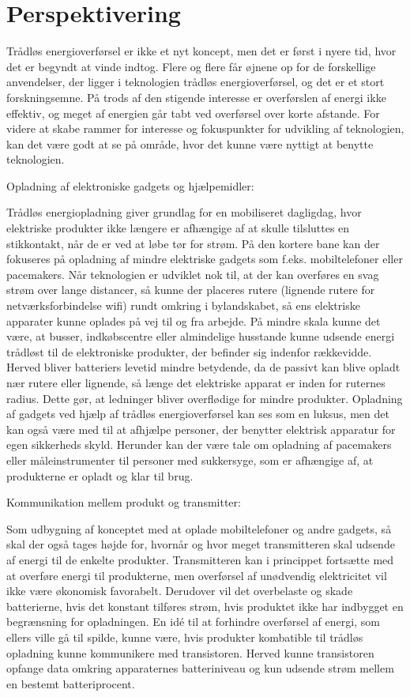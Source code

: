 \chapter{Perspektivering}

Trådløs energioverførsel er ikke et nyt koncept, men det er først i nyere tid, hvor det er begyndt at vinde indtog. Flere og flere får øjnene op for de forskellige anvendelser, der ligger i teknologien trådløs energioverførsel, og det er et stort forskningsemne. På trods af den stigende interesse er overførslen af energi ikke effektiv, og meget af energien går tabt ved overførsel over korte afstande. For videre at skabe rammer for interesse og fokuspunkter for udvikling af teknologien, kan det være godt at se på område, hvor det kunne være nyttigt at benytte teknologien.

Opladning af elektroniske gadgets og hjælpemidler:
 	
Trådløs energiopladning giver grundlag for en mobiliseret dagligdag, hvor elektriske produkter ikke længere er afhængige af at skulle tilsluttes en stikkontakt, når de er ved at løbe tør for strøm. På den kortere bane kan der fokuseres på opladning af mindre elektriske gadgets som f.eks. mobiltelefoner eller pacemakers. Når teknologien er udviklet nok til, at der kan overføres en svag strøm over lange distancer, så kunne der placeres rutere (lignende rutere for netværksforbindelse wifi) rundt omkring i bylandskabet, så ens elektriske apparater kunne oplades på vej til og fra arbejde. På mindre skala kunne det være, at busser, indkøbscentre eller almindelige husstande kunne udsende energi trådløst til de elektroniske produkter, der befinder sig indenfor rækkevidde. Herved bliver batteriers levetid mindre betydende, da de passivt kan blive opladt nær rutere eller lignende, så længe det elektriske apparat er inden for ruternes radius. Dette gør, at ledninger bliver overflødige for mindre produkter. Opladning af gadgets ved hjælp af trådløs energioverførsel kan ses som en luksus, men det kan også være med til at afhjælpe personer, der benytter elektrisk apparatur for egen sikkerheds skyld. Herunder kan der være tale om opladning af pacemakers eller måleinstrumenter til personer med sukkersyge, som er afhængige af, at produkterne er opladt og klar til brug.

Kommunikation mellem produkt og transmitter:
 	
Som udbygning af konceptet med at oplade mobiltelefoner og andre gadgets, så skal der også tages højde for, hvornår og hvor meget transmitteren skal udsende af energi til de enkelte produkter. Transmitteren kan i princippet fortsætte med at overføre energi til produkterne, men overførsel af unødvendig elektricitet vil ikke være økonomisk favorabelt. Derudover vil det overbelaste og skade batterierne, hvis det konstant tilføres strøm, hvis produktet ikke har indbygget en begrænsning for opladningen. En idé til at forhindre overførsel af energi, som ellers ville gå til spilde, kunne være, hvis produkter kombatible til trådløs opladning kunne kommunikere med transistoren. Herved kunne transistoren opfange data omkring apparaternes batteriniveau og kun udsende strøm mellem en bestemt batteriprocent.

